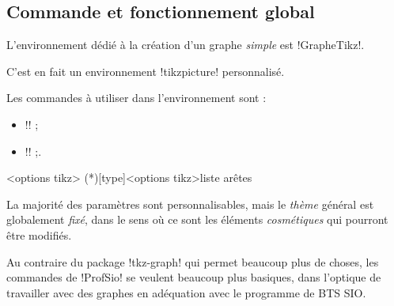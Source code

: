 \documentclass[french,a4paper,11pt]{article}
\begin{document}
{{\subsection{Commande et fonctionnement global}

\begin{cautionblock}
L'environnement dédié à la création d'un graphe \textit{simple} est \motcletex!GrapheTikz!.

C'est en fait un environnement \motcletex!tikzpicture! personnalisé.

\smallskip

Les commandes à utiliser dans l'environnement sont :

\begin{itemize}
	\item \motcletex!\GrphPlaceSommets! ;
	\item \motcletex!\GrphTraceAretes! ;.
\end{itemize}
\vspace*{-\baselineskip}\leavevmode
\end{cautionblock}

\begin{DemoCode}
\begin{GrapheTikz}[clés]<options tikz>
	\GrphTraceAretes(*)[type]<options tikz>{liste arêtes}
\end{GrapheTikz}
\end{DemoCode}

\begin{DemoCode}[]
\begin{GrapheTikz}
\end{GrapheTikz}
\end{DemoCode}

\begin{warningblock}
La majorité des paramètres sont personnalisables, mais le \textit{thème} général est globalement \textit{fixé}, dans le sens où ce sont les éléments \textit{cosmétiques} qui pourront être modifiés.

\smallskip

Au contraire du package \packagetex!tkz-graph! qui permet beaucoup plus de choses, les commandes de \packagetex!ProfSio! se veulent beaucoup plus basiques, dans l'optique de travailler avec des graphes en adéquation avec le programme de BTS SIO.
\end{warningblock}

}}
\end{document}
